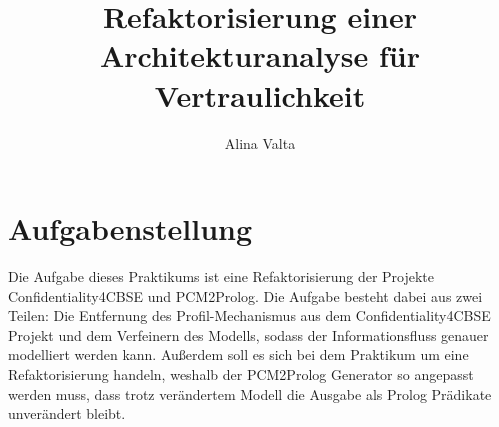 \documentclass[twoside, ngerman]{sdqseminar}
\author{Alina Valta}
\title{Refaktorisierung einer Architekturanalyse für Vertraulichkeit}
\begin{document}
\setpdf

\maketitle

 

\begin{abstract}
%
\end{abstract}



%
%
%


\section{Aufgabenstellung}
Die Aufgabe dieses Praktikums ist eine Refaktorisierung der Projekte Confidentiality4CBSE\cite{Confidentiality4CBSE} und PCM2Prolog\cite{PCM2Prolog}. Die Aufgabe besteht dabei aus zwei Teilen: Die Entfernung des Profil-Mechanismus aus dem Confidentiality4CBSE Projekt und dem Verfeinern des Modells, sodass der Informationsfluss genauer modelliert werden kann. Außerdem soll es sich bei dem Praktikum um eine Refaktorisierung handeln, weshalb der PCM2Prolog Generator so angepasst werden muss, dass trotz verändertem Modell die Ausgabe als Prolog Prädikate unverändert bleibt.
\end{document}
